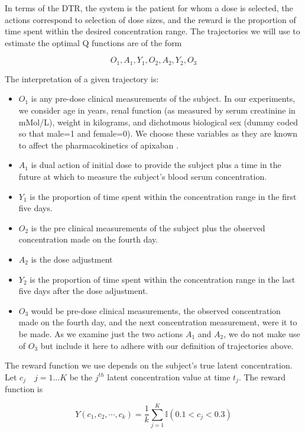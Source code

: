 In terms of the DTR, the system is the patient for whom a dose is selected, the actions correspond to selection of dose sizes, and the reward is the proportion of time spent within the desired concentration range. The trajectories we will use to estimate the optimal Q functions are of the form

\begin{equation}\label{key}
O_1, A_1, Y_1, O_2, A_2, Y_2, O_3
\end{equation}

\noindent The interpretation of a given trajectory is:
\begin{itemize}
	\item $ O_1 $ is any pre-dose clinical measurements of the subject.  In our experiments, we consider age in years, renal function (as measured by serum creatinine in mMol/L), weight in kilograms, and dichotmous biological sex (dummy coded so that male=1 and female=0).  We choose these variables as they are known to affect the pharmacokinetics of apixaban \cite{byon2019apixaban}.  
	\item $ A_1 $ is dual action of initial dose to provide the subject plus a time in the future at which to measure the subject’s blood serum concentration.
	\item $ Y_1 $ is the proportion of time spent within the concentration range in the first five days.
	\item $ O_2 $ is the pre clinical measurements of the subject plus the observed concentration made on the fourth day.
	\item $ A_2 $ is the dose adjustment
	\item $ Y_2 $ is the proportion of time spent within the concentration range in the last five days after the dose adjustment.
	\item $ O_3 $ would be pre-dose clinical measurements, the observed concentration made on the fourth day, and the next concentration measurement, were it to be made. As we examine just the two actions $ A_1 $ and $ A_2 $, we do not make use of $ O_3 $ but include it here to adhere with our definition of trajectories above.
\end{itemize}

The reward function we use depends on the subject’s true latent concentration. Let $ c_j \quad j=1...K $ be the $ j^{th}$ latent concentration value at time $ t_j $.  The reward function is 

\begin{equation}
Y(c_1, c_2, \cdots, c_k) = \dfrac{1}{k}\sum_{j=1}^K \mathbb{I}(0.1 < c_j < 0.3)
\end{equation}

